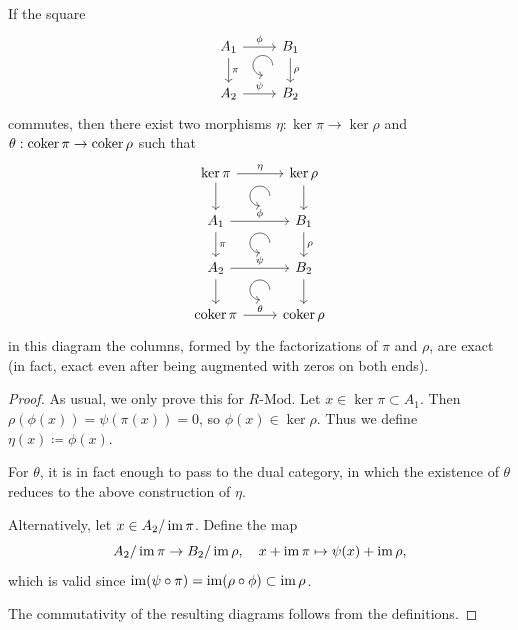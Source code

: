 \begin{lem}\label{lem first chasing lemma}
    If the square 
    \[\begin{tikzcd}[every matrix/.append style={name=m},   
        execute at end picture={\draw [<-] ([xshift=-7mm,yshift=-10mm]m-1-2.north) arc[start angle=-90,delta angle=-270,radius=0.25cm];}]
        A_1 \arrow[r,"\phi"]\arrow[d,"\pi"] & B_1\arrow[d,"\rho"] \\
        A_2\arrow[r,"\psi"] &B_2 
    \end{tikzcd}\]
    commutes, then there exist two morphisms $\eta:\ker\pi\to\ker\rho $ and $\theta:\operatorname{coker}\pi\to\operatorname{coker}\rho$ such that
    \[\begin{tikzcd}[every matrix/.append style={name=m},   
        execute at end picture={\draw [<-] ([xshift=-11mm,yshift=1mm]m-2-2.north) arc[start angle=-90,delta angle=-270,radius=0.25cm];
        \draw [<-] ([xshift=-11mm,yshift=1mm]m-3-2.north) arc[start angle=-90,delta angle=-270,radius=0.25cm];
        \draw [<-] ([xshift=-11mm,yshift=1mm]m-4-2.north) arc[start angle=-90,delta angle=-270,radius=0.25cm];}]
        \ker\pi \arrow[r,"\eta"]\arrow[d] & \ker\rho \arrow[d] \\
        A_1\arrow[r,"\phi"]\arrow[d,"\pi"] &B_1\arrow[d,"\rho"]\\
        A_2\arrow[r,"\psi"]\arrow[d] &B_2\arrow[d]\\
        \coker\pi \arrow[r,"\theta"] & \coker\rho
    \end{tikzcd}\]
    in this diagram the columns, formed by the factorizations of $\pi$ and $\rho$, are exact (in fact, exact even after being augmented with zeros on both ends).
\end{lem}
\begin{proof}
    As usual, we only prove this for $R\text{-}\mathrm{Mod}$. Let $x\in \ker\pi\subset A_1$. Then $\rho(\phi(x))=\psi(\pi(x))=0$, so $\phi(x)\in\ker\rho$. Thus we define $\eta(x)\coloneqq\phi(x)$.
    
    For $\theta$, it is in fact enough to pass to the dual category, in which the existence of $\theta$ reduces to the above construction of $\eta$.
    
    Alternatively, let $x\in A_2/\operatorname{im}\pi$. Define the map \[A_2/\operatorname{im}\pi\to B_2/\operatorname{im}\rho,\quad x+\operatorname{im}\pi\mapsto \psi(x)+\operatorname{im}\rho,\]
    which is valid since $\operatorname{im}(\psi\circ\pi)=\operatorname{im}(\rho\circ\phi)\subset \operatorname{im}\rho$. 
    
    The commutativity of the resulting diagrams follows from the definitions.
\end{proof}

